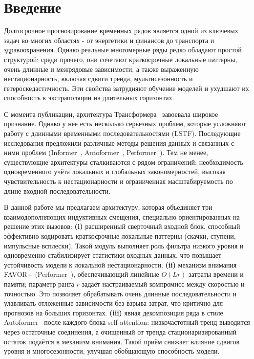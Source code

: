 \section{Введение}

Долгосрочное прогнозирование временных рядов является одной из ключевых задач
во многих областях - от энергетики и финансов до транспорта и здравоохранения.
Однако реальные многомерные ряды редко обладают простой структурой: среди прочего, 
они сочетают краткосрочные локальные паттерны, очень длинные и межрядовые
зависимости, а также выраженную нестационарность, включая сдвиги тренда,
мультисезонность и гетероскедастичность. Эти свойства затрудняют обучение
моделей и ухудшают их способность к экстраполяции на длительных горизонтах.

С момента публикации, архитектура Трансформера~\cite{transformer} завоевала
широкое признание. Однако у нее есть несколько серьезных проблем, 
которые усложняют работу с длинными временными последовательностями
(LSTF). Последующие исследования предложили различные методы решения 
данных и связанных с ними проблем (Informer~\cite{informer},
Autoformer~\cite{autoformer}, Performer~\cite{performer}). Тем не менее,
существующие архитектуры сталкиваются с рядом ограничений: необходимость
одновременного учёта локальных и глобальных закономерностей, высокая
чувствительность к нестационарности и ограниченная масштабируемость по длине
входной последовательности.

В данной работе мы предлагаем архитектуру, которая объединяет три
взаимодополняющих индуктивных смещения, специально ориентированных на решение
этих вызовов:  
\textbf{(i)} 
расширенный сверточный входной блок, способный эффективно кодировать 
краткосрочные локальные паттерны (скачки, ступени, импульсные всплески). 
Такой модуль выполняет роль фильтра низкого уровня и одновременно стабилизирует 
статистики входных данных, что повышает устойчивость модели к локальной нестационарности;
\textbf{(ii)} 
механизм внимания FAVOR+ (Performer~\cite{performer}), обеспечивающий линейные
$O(Lr)$ затраты времени и памяти; параметр ранга $r$ задаёт настраиваемый
компромисс между скоростью и точностью. 
Это позволяет обрабатывать очень длинные последовательности и улавливать отложенные 
зависимости без взрыва затрат, что критично для прогнозов на больших горизонтах. 
\textbf{(iii)} 
явная декомпозиция ряда в стиле Autoformer~\cite{autoformer} после каждого блока self-attention: 
низкочастотный тренд выводится через остаточные соединения, а очищенный от 
тренда стационаризированный остаток подаётся в механизм внимания. Такой приём 
снижает влияние сдвигов уровня и многосезонности, улучшая обобщающую способность модели. 

